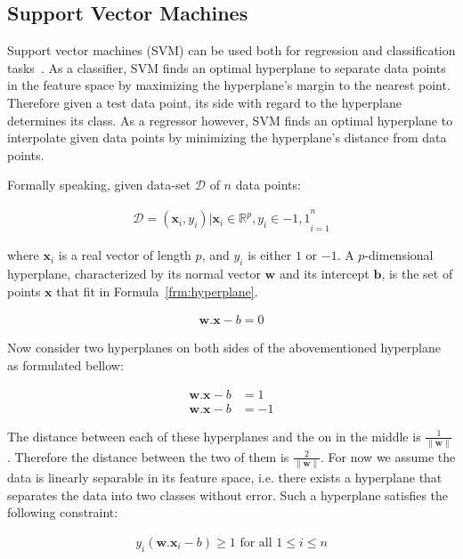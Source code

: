 \subsection{Support Vector Machines}
Support vector machines (SVM) can be used both for regression and classification tasks~\cite{svm2, svr1}. As a classifier, SVM finds an optimal hyperplane to separate data points in the feature space by maximizing the hyperplane's margin to the nearest point. Therefore given a test data point, its side with regard to the hyperplane determines its class. As a regressor however, SVM finds an optimal hyperplane to interpolate given data points by minimizing the hyperplane's distance from data points.

Formally speaking, given data-set $\mathcal{D}$ of $n$ data points:

\begin{align}
  \mathcal{D}={(\mathbf{x}_i, y_i) | \mathbf{x}_i \in \mathbb{R}^p, y_i \in {-1, 1}}_{i=1}^{n}
\end{align}

where $\mathbf{x}_i$ is a real vector of length $p$, and $y_i$ is either $1$ or $-1$. A $p$-dimensional hyperplane, characterized by its normal vector $\mathbf{w}$ and its intercept $\mathbf{b}$, is the set of points $\mathbf{x}$ that fit in Formula~\ref{frm:hyperplane}.

\begin{align}
  \mathbf{w} . \mathbf{x} - b = 0
  \label{frm:hyperplane}
\end{align}

Now consider two hyperplanes on both sides of the abovementioned hyperplane as formulated bellow:

\begin{align}
  \mathbf{w} . \mathbf{x} - b &= 1 \nonumber \\
  \mathbf{w} . \mathbf{x} - b &= -1
\end{align}

The distance between each of these hyperplanes and the on in the middle is $\frac{1}{\parallel \mathbf{w} \parallel}$. Therefore the distance between the two of them is $\frac{2}{\parallel \mathbf{w} \parallel}$. For now we assume the data is linearly separable in its feature space, i.e. there exists a hyperplane that separates the data into two classes without error. Such a hyperplane satisfies the following constraint:

\begin{align}
  y_i (\mathbf{w} . \mathbf{x}_i - b)\geq 1 \text{ for all } 1 \leq i \leq n
\end{align}


